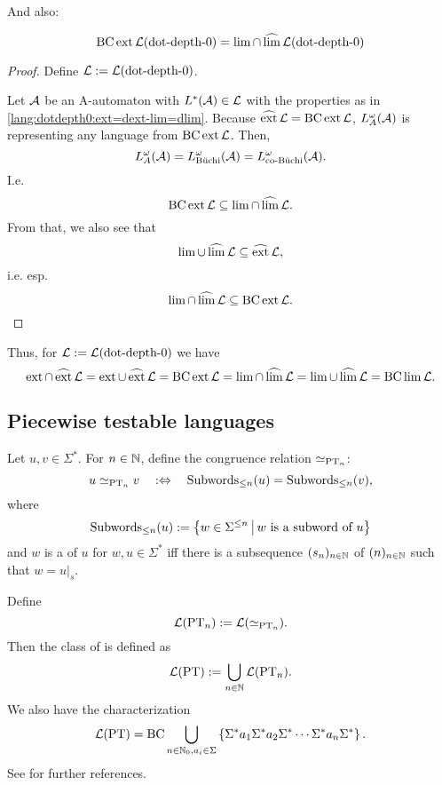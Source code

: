 And also:
\begin{lemma}
\[ \operatorname{BC} \operatorname{ext} \mathcal{L}(\textup{\textrm{dot-depth-$0$}}) = \lim \cap \operatorname{\widehat{lim}} \mathcal{L}(\textup{\textrm{dot-depth-$0$}}) \]
\begin{proof}
Define $\mathcal{L} := \mathcal{L}(\textup{\textrm{dot-depth-$0$}})$.

Let $\mathcal{A}$ be an A-automaton with $L^*(\mathcal{A}) \in \mathcal{L}$ with the properties as in \cref{lang:dotdepth0:ext=dext-lim=dlim}. Because $\operatorname{\widehat{ext}} \mathcal{L} = \operatorname{BC} \operatorname{ext} \mathcal{L}$, $L^\omega_A(\mathcal{A})$ is representing any language from $\operatorname{BC} \operatorname{ext} \mathcal{L}$. Then,
\[ L^\omega_A(\mathcal{A}) = L^\omega_\text{Büchi}(\mathcal{A}) = L^\omega_\text{co-Büchi}(\mathcal{A}) . \]
I.e.
\[ \operatorname{BC} \operatorname{ext} \mathcal{L} \subseteq \lim \cap \operatorname{\widehat{lim}} \mathcal{L} . \]
From that, we also see that
\[ \lim \cup \operatorname{\widehat{lim}} \mathcal{L} \subseteq \operatorname{\widehat{ext}} \mathcal{L} , \]
i.e. esp.
\[ \lim \cap \operatorname{\widehat{lim}} \mathcal{L} \subseteq \operatorname{BC} \operatorname{ext} \mathcal{L}. \]
\end{proof}
\end{lemma}

Thus, for $\mathcal{L} := \mathcal{L}(\textup{\textrm{dot-depth-$0$}})$ we have
\[ \operatorname{ext} \cap \operatorname{\widehat{ext}} \mathcal{L} =
\operatorname{ext} \cup \operatorname{\widehat{ext}} \mathcal{L} =
\operatorname{BC} \operatorname{ext} \mathcal{L} =
\lim \cap \operatorname{\widehat{lim}} \mathcal{L} =
\lim \cup \operatorname{\widehat{lim}} \mathcal{L} =
\operatorname{BC} \lim \mathcal{L} . \]

\subsection{Piecewise testable languages}
\label{lang:PT}
Let $u,v \in \Sigma^*$. For $n \in \mathbb{N}$, define the congruence relation $\simeq_{\textup{\textrm{PT}}_n}$:
\[ u \simeq_{\PT_n} v \ \ \ :\Leftrightarrow \ \ \ \operatorname{Subwords}_{\le n}(u) = \operatorname{Subwords}_{\le n}(v) , \]
where
\[ \operatorname{Subwords}_{\le n}(u) := \Set{w \in \Sigma^{\le n}}{\text{$w$ is a subword of $u$}} \]
and $w$ is a  of $u$ for $w,u \in \Sigma^*$ iff there is a subsequence $(s_n)_{n\in\mathbb{N}}$ of $(n)_{n\in\mathbb{N}}$ such that $w = u|_s$.

Define
\[ \mathcal{L}(\textup{\textrm{PT}}_n) := \mathcal{L}(\simeq_{\textup{\textrm{PT}}_n}). \]
Then the class of  is defined as
\[ \mathcal{L}(\textup{\textrm{PT}}) := \bigcup_{n\in\mathbb{N}} \mathcal{L}(\textup{\textrm{PT}}_n) . \]
We also have the characterization
\[ \Lang(\PT) = \BC \bigcup_{n\in\N_0,a_i \in \Sigma} \Set{\Sigma^* a_1 \Sigma^* a_2 \Sigma^* \cdots\Sigma^* a_n \Sigma^*} . \]
See \cite[Section 2.3]{ConcHierR104} for further references.

